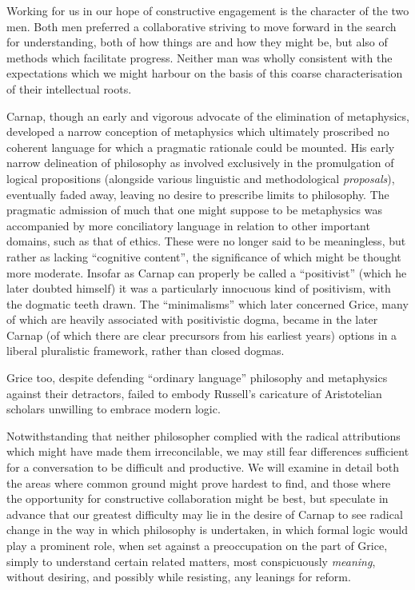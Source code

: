 \documentclass[10pt,titlepage]{book}
\begin{document}
Working for us in our hope of constructive engagement is the character of the two men.
Both men preferred a collaborative striving to move forward in the search for understanding, both of how things are and how they might be, but also of methods which facilitate progress.
Neither man was wholly consistent with the expectations which we might harbour on the basis of this coarse characterisation of their intellectual roots.

Carnap, though an early and vigorous advocate of the elimination of metaphysics, developed a narrow conception of metaphysics which ultimately proscribed no coherent language for which a pragmatic rationale could be mounted.
His early narrow delineation of philosophy as involved exclusively in the promulgation of logical propositions (alongside various linguistic and methodological {\it proposals}), eventually faded away, leaving no desire to prescribe limits to philosophy.
The pragmatic admission of much that one might suppose to be metaphysics was accompanied by more conciliatory language in relation to other important domains, such as that of ethics.
These were no longer said to be meaningless, but rather as lacking ``cognitive content'', the significance of which might be thought more moderate.
Insofar as Carnap can properly be called a ``positivist'' (which he later doubted himself) it was a particularly innocuous kind of positivism, with the dogmatic teeth drawn.
The ``minimalisms'' which later concerned Grice, many of which are heavily associated with positivistic dogma, became in the later Carnap (of which there are clear precursors from his earliest years) options in a liberal pluralistic framework, rather than closed dogmas.

Grice too, despite defending ``ordinary language'' philosophy and metaphysics against their detractors, failed to embody Russell's caricature of Aristotelian scholars unwilling to embrace modern logic.

Notwithstanding that neither philosopher complied with the radical attributions which might have made them irreconcilable, we may still fear differences sufficient for a conversation to be difficult and productive.
We will examine in detail both the areas where common ground might prove hardest to find, and those where the opportunity for constructive collaboration might be best, but speculate in advance that our greatest difficulty may lie in the desire of Carnap to see radical change in the way in which philosophy is undertaken, in which formal logic would play a prominent role, when set against a preoccupation on the part of Grice, simply to understand certain related matters, most conspicuously {\it meaning}, without desiring, and possibly while resisting, any leanings for reform.
\end{document}
